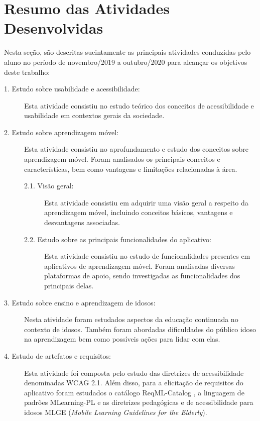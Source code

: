\chapter{Resumo das Atividades Desenvolvidas} \label{sec:resumo_ativ}
Nesta seção, são descritas sucintamente as principais atividades conduzidas pelo aluno no período de novembro/2019 a outubro/2020 para alcançar os objetivos deste trabalho:

\begin{description}
\item[1. Estudo sobre usabilidade e acessibilidade:]
Esta atividade consistiu no estudo teórico dos conceitos de acessibilidade e usabilidade em contextos gerais da sociedade.

\item[2. Estudo sobre aprendizagem móvel:] Esta atividade consistiu no aprofundamento e estudo dos conceitos sobre aprendizagem móvel. Foram analisados os principais conceitos e características, bem como vantagens e limitações relacionadas à área. 

\begin{description}
    \item[2.1. Visão geral:]
    Esta atividade consistiu em adquirir uma visão geral a respeito da aprendizagem móvel, incluindo conceitos básicos, vantagens e desvantagens associadas.
    
    \item[2.2. Estudo sobre as principais funcionalidades do aplicativo:]
    Esta atividade consistiu no estudo de funcionalidades presentes em aplicativos de aprendizagem móvel. Foram analisadas diversas plataformas de apoio, sendo investigadas as funcionalidades dos principais delas.
\end{description}

\item[3. Estudo sobre ensino e aprendizagem de idosos:] Nesta atividade foram estudados aspectos da educação continuada no contexto de idosos. Também foram abordadas dificuldades do público idoso na aprendizagem bem como possíveis ações para lidar com elas.

\item[4. Estudo de artefatos e requisitos:]
Esta atividade foi composta pelo estudo das diretrizes de acessibilidade denominadas WCAG 2.1. Além disso, para a elicitação de requisitos do aplicativo foram estudados o catálogo ReqML-Catalog \citep{soad2017reqml}, a linguagem de padrões MLearning-PL \citep{Fioravanti2017_plop} e as diretrizes pedagógicas e de acessibilidade para idosos MLGE (\textit{Mobile Learning Guidelines for the Elderly}).


\end{description}
